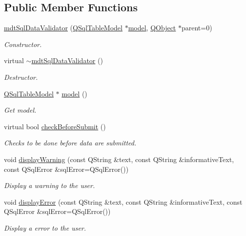 \subsection*{Public Member Functions}
\begin{DoxyCompactItemize}
\item 
\hyperlink{classmdt_sql_data_validator_a609bc3f4378f092a74e47907dc3e0222}{mdt\-Sql\-Data\-Validator} (\hyperlink{class_q_sql_table_model}{Q\-Sql\-Table\-Model} $\ast$\hyperlink{classmdt_sql_data_validator_a4970687a15ac3c8099c13164fba58291}{model}, \hyperlink{class_q_object}{Q\-Object} $\ast$parent=0)
\begin{DoxyCompactList}\small\item\em Constructor. \end{DoxyCompactList}\item 
virtual \hyperlink{classmdt_sql_data_validator_a2d1348a7035ac4fcf4f4cd47a6c2fa52}{$\sim$mdt\-Sql\-Data\-Validator} ()
\begin{DoxyCompactList}\small\item\em Destructor. \end{DoxyCompactList}\item 
\hyperlink{class_q_sql_table_model}{Q\-Sql\-Table\-Model} $\ast$ \hyperlink{classmdt_sql_data_validator_a4970687a15ac3c8099c13164fba58291}{model} ()
\begin{DoxyCompactList}\small\item\em Get model. \end{DoxyCompactList}\item 
virtual bool \hyperlink{classmdt_sql_data_validator_af291c18e9c8994085ed4664db3fdcb7c}{check\-Before\-Submit} ()
\begin{DoxyCompactList}\small\item\em Checks to be done before data are submitted. \end{DoxyCompactList}\item 
void \hyperlink{classmdt_sql_data_validator_aef49b35ed8861accd9547b35aabc4ef4}{display\-Warning} (const Q\-String \&text, const Q\-String \&informative\-Text, const Q\-Sql\-Error \&sql\-Error=Q\-Sql\-Error())
\begin{DoxyCompactList}\small\item\em Display a warning to the user. \end{DoxyCompactList}\item 
void \hyperlink{classmdt_sql_data_validator_a9d21a05e4e426235c908ba16437e9554}{display\-Error} (const Q\-String \&text, const Q\-String \&informative\-Text, const Q\-Sql\-Error \&sql\-Error=Q\-Sql\-Error())
\begin{DoxyCompactList}\small\item\em Display a error to the user. \end{DoxyCompactList}\end{DoxyCompactItemize}


